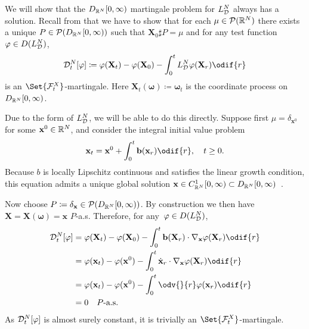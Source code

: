 We will show that the \(D_{\mathbb{R}^N}[0,\infty)\) martingale problem for \(L_{\mathcal{D}}^N\) always has a solution.   %
Recall from  that we have to show that for each \(\mu \in \mathcal{P}(\mathbb{R}^N)\) there exists a unique \(P \in \mathcal{P}(D_{\mathbb{R}^N}[0,\infty))\) such that \( \bm{X}_0 \sharp P = \mu \) and for any test function \(\varphi \in D(L_{\mathcal{D}}^N)\),
\begin{equation}
  \cD_t^{N}[\varphi]
  \coloneqq \varphi(\bm{X}_t) - \varphi(\bm{X}_0) - \int_0^t L_{\cD}^{N} \varphi(\bm{X}_r) \odif{r}
\end{equation}
is an \(\Set{\cF_t^X}\)-martingale.
Here \(\bm{X}_t(\bm{\omega}) \coloneqq \bm{\omega}_t\) is the coordinate process on \(D_{\mathbb{R}^N}[0,\infty)\).

Due to the form of \(L_{\mathcal{D}}^N\), we will be able to do this directly.
Suppose first \(\mu = \delta_{\bm{x}^0}\) for some \(\mathbf{x}^0 \in \mathbb{R}^N\), and consider the integral initial value problem
\begin{equation}
  \bm{x}_t = \bm{x}^0 + \int_0^t \bm{b}(\bm{x}_r) \odif{r}, \quad t \geq 0.
\end{equation}
Because \(b\) is locally Lipschitz continuous and satisfies the linear growth condition, this equation admits a unique global solution \(\mathbf{x} \in C^1_{\mathbb{R}^N}[0,\infty) \subset D_{\mathbb{R}^N}[0,\infty)\)~\cite{ode_result}.

Now choose \(P \coloneqq \delta_{\mathbf{x}} \in \mathcal{P}(D_{\mathbb{R}^N}[0,\infty))\).
By construction we then have \(\bm{X} = \bm{X}(\bm{\omega}) = \bm{x}\) \(P\)-a.s.
Therefore, for any~\(\varphi \in D(L_{\mathcal{D}}^N)\),
\begin{equation}
  \begin{split}
    \cD_t^{N}[\varphi] & = \varphi(\bm{X}_t) - \varphi(\bm{X}_0) - \int_0^t \bm{b}(\bm{X}_r) \cdot \nabla_{\bm{x}} \varphi(\bm{X}_r) \odif{r} \\
                       & = \varphi(\bm{x}_t) - \varphi(\bm{x}^0) - \int_0^t \dot{\bm{x}}_r \cdot \nabla_{\bm{x}} \varphi(\bm{X}_r) \odif{r}   \\
                       & = \varphi(\bm{x}_t) - \varphi(\bm{x}^0) - \int_0^t \odv{}{r} \varphi(\bm{x}_r) \odif{r}                              \\
                       & = 0 \quad P\text{-a.s.}
  \end{split}
\end{equation}
As \(\mathcal{D}_t^{N}[\varphi]\) is almost surely constant, it is trivially an \(\Set{\cF_t^X}\)-martingale.


